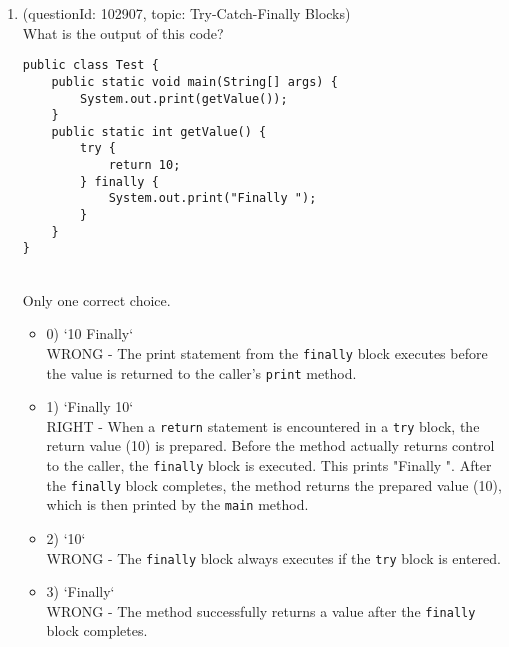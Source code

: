 \documentclass[12pt]{article}
\begin{document}
\begin{enumerate}[label=(\arabic*)]
\begin{itemize}
\end{itemize}
\item (questionId: 102907, topic: Try-Catch-Finally Blocks) \\ 
What is the output of this code?
\begin{verbatim}
public class Test {
    public static void main(String[] args) {
        System.out.print(getValue());
    }
    public static int getValue() {
        try {
            return 10;
        } finally {
            System.out.print("Finally ");
        }
    }
}
\end{verbatim}
\\ \noindent Only one correct choice. 
\begin{itemize}
\item 0) `10 Finally`
 \\ 
WRONG - The print statement from the \verb|finally| block executes before the value is returned to the caller's \verb|print| method.

\item 1) `Finally 10`
 \\ 
RIGHT - When a \verb|return| statement is encountered in a \verb|try| block, the return value (10) is prepared. Before the method actually returns control to the caller, the \verb|finally| block is executed. This prints "Finally ". After the \verb|finally| block completes, the method returns the prepared value (10), which is then printed by the \verb|main| method.

\item 2) `10`
 \\ 
WRONG - The \verb|finally| block always executes if the \verb|try| block is entered.

\item 3) `Finally`
 \\ 
WRONG - The method successfully returns a value after the \verb|finally| block completes.


\end{itemize}
\end{enumerate}
\end{document}
